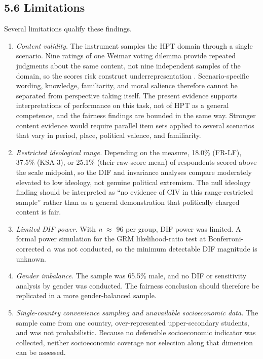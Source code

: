 \documentclass[PCJ,Unicode,screen,mode=plain]{cedram}
\begin{document}
\subsection*{5.6 Limitations}\label{limitations}

Several limitations qualify these findings.

\begin{enumerate}
\def\labelenumi{\arabic{enumi}.}

\item \emph{Content validity.} The instrument samples the HPT domain
  through a single scenario. Nine ratings of one Weimar voting dilemma
  provide repeated judgments about the same content, not nine independent
  samples of the domain, so the scores risk construct underrepresentation
  \citep{Messick1995Validity}. Scenario-specific wording, knowledge,
  familiarity, and moral salience therefore cannot be separated from
  perspective taking itself. The present evidence supports interpretations
  of performance on this task, not of HPT as a general competence, and the
  fairness findings are bounded in the same way. Stronger content evidence
  would require parallel item sets applied to several scenarios that vary in
  period, place, political valence, and familiarity.

\item \emph{Restricted ideological range.} Depending on the measure,
  18.0\% (FR-LF), 37.5\% (KSA-3), or 25.1\% (their raw-score mean) of respondents
  scored above the scale midpoint, so the DIF and
  invariance analyses compare moderately elevated to low ideology, not
  genuine political extremism. The null ideology finding should be
  interpreted as ``no evidence of CIV in this range-restricted sample''
  rather than as a general demonstration that politically charged
  content is fair.

\item \emph{Limited DIF power.} With \emph{n} \(\approx\) 96 per
  group, DIF power was limited. A formal power simulation for the GRM
  likelihood-ratio test at Bonferroni-corrected \(\alpha\) was not
  conducted, so the minimum detectable DIF magnitude is unknown.

\item \emph{Gender imbalance.} The sample was 65.5\% male, and no DIF
  or sensitivity analysis by gender was conducted. The fairness
  conclusion should therefore be replicated in a more gender-balanced
  sample.

\item \emph{Single-country convenience sampling and unavailable
  socioeconomic data.} The sample came from one country, over-represented
  upper-secondary students, and was not probabilistic. Because no defensible socioeconomic indicator was
  collected, neither socioeconomic coverage nor selection along that
  dimension can be assessed.


\end{enumerate}
\end{document}
